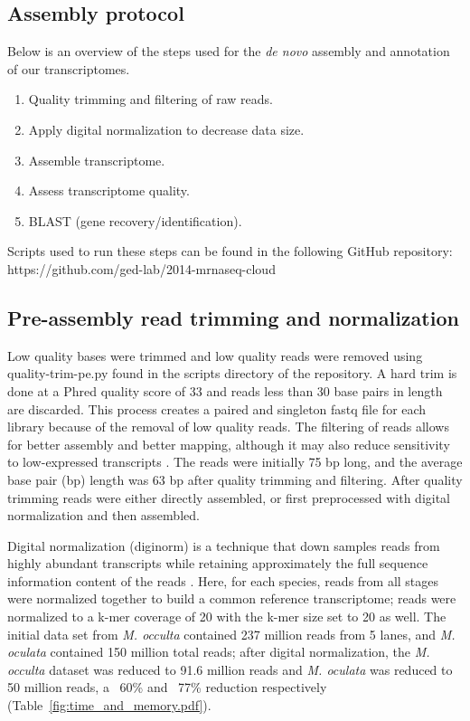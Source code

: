 \subsection{Assembly protocol}
Below is an overview of the steps used for the \textit{de novo} assembly and annotation of our transcriptomes.
\begin{enumerate}
	\item Quality trimming and filtering of raw reads.
	\item Apply digital normalization to decrease data size.
	\item Assemble transcriptome.
	\item Assess transcriptome quality.
	\item BLAST (gene recovery/identification).
\end{enumerate}
Scripts used to run these steps can be found in the following GitHub repository: https://github.com/ged-lab/2014-mrnaseq-cloud
\subsection{Pre-assembly read trimming and normalization} 
Low quality bases were trimmed and low quality reads were removed using quality-trim-pe.py found in the scripts directory of the repository. A hard trim is done at a Phred quality score of 33 and reads less than 30 base pairs in length are discarded. This process creates a paired and singleton fastq file for each library because of the removal of low quality reads. The filtering of reads allows for better assembly and better mapping, although it may also reduce sensitivity to low-expressed transcripts \citep{lohse_robina:_2012, macmanes_optimal_2014}. The reads were initially 75 bp long, and the average base pair (bp) length was 63 bp after quality trimming and filtering. After quality trimming reads were either directly assembled, or first preprocessed with digital normalization and then assembled. 

Digital normalization (diginorm) is a technique that down samples reads from highly abundant transcripts while retaining approximately the full sequence information content of the reads \citep{brown_reference-free_2012}. Here, for each species, reads from all stages were normalized together to build a common reference transcriptome; reads were normalized to a k-mer coverage of 20 with the k-mer size set to 20 as well.  The initial data set from \textit{M. occulta} contained 237 million reads from 5 lanes, and \textit{M. oculata} contained 150 million total reads; after digital normalization, the \textit{M. occulta} dataset was reduced to 91.6 million reads and \textit{M. oculata} was reduced to 50 million reads, a ~60\% and ~77\% reduction respectively (Table~\ref{fig:time_and_memory.pdf}).

